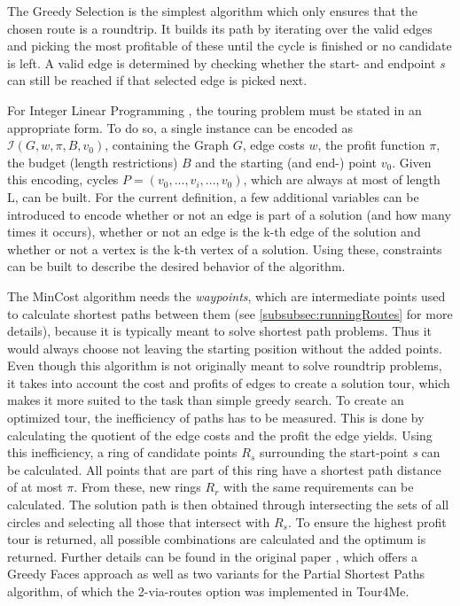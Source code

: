 The Greedy Selection \cite{buchin_tour4me_2022, wayahdi_greedy_2021} is the simplest algorithm which only ensures that the chosen route is a roundtrip.
It builds its path by iterating over the valid edges and picking the most profitable of these until the cycle is finished or no candidate is left.
A valid edge is determined by checking whether the start- and endpoint \textit{s} can still be reached if that selected edge is picked next.


For Integer Linear Programming \cite{buchin_tour4me_2022, graver_foundations_1975}, the touring problem must be stated in an appropriate form.
To do so, a single instance can be encoded as $\mathcal{I}(G, w, \pi, B, v_0)$, containing the Graph $G$, edge costs $w$, the profit function $\pi$, the budget (length restrictions) $B$ and the starting (and end-) point $v_0$.
Given this encoding, cycles $P=(v_0,...,v_i,...,v_0)$, which are always at most of length L, can be built.
For the current definition, a few additional variables can be introduced to encode whether or not an edge is part of a solution (and how many times it occurs), whether or not an edge is the k-th edge of the solution and whether or not a vertex is the k-th vertex of a solution. 
Using these, constraints can be built to describe the desired behavior of the algorithm.

The MinCost algorithm \cite{buchin_tour4me_2022, gemsa_efficient_2013} needs the \textit{waypoints}, which are intermediate points used to calculate shortest paths between them (see \ref{subsubsec:runningRoutes} for more details), because it is typically meant to solve shortest path problems. 
Thus it would always choose not leaving the starting position without the added points. 
Even though this algorithm is not originally meant to solve roundtrip problems, it takes into account the cost and profits of edges to create a solution tour, which makes it more suited to the task than simple greedy search.
To create an optimized tour, the inefficiency of paths has to be measured. 
This is done by calculating the quotient of the edge costs and the profit the edge yields. 
Using this inefficiency, a ring of candidate points $R_s$ surrounding the start-point \textit{s} can be calculated.
All points that are part of this ring have a shortest path distance of at most $\pi$.
From these, new rings $R_r$ with the same requirements can be calculated. 
The solution path is then obtained through intersecting the sets of all circles and selecting all those that intersect with $R_s$.
To ensure the highest profit tour is returned, all possible combinations are calculated and the optimum is returned\cite{buchin_tour4me_2022}. 
Further details can be found in the original paper \cite{gemsa_efficient_2013}, which offers a Greedy Faces approach as well as two variants for the Partial Shortest Paths algorithm, of which the 2-via-routes option was implemented in Tour4Me.

